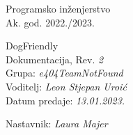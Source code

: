 \documentclass[12pt]{report}
\begin{document}
 
		
		\begin{titlepage}
			\begin{center}
				\LARGE Programsko inženjerstvo\\
				\large Ak. god. 2022./2023.\\
				
				
				\huge DogFriendly\\
				\Large Dokumentacija, Rev. \textit{2}\\
				
				\normalsize
				Grupa: \textit{e404TeamNotFound}\\
				Voditelj: \textit{Leon  Stjepan Uroić}\\
				
				
				Datum predaje: \textit{13.01.2023.}\\
				
				
				Nastavnik: \textit{Laura Majer}\\
				
			\end{center}
			
		\end{titlepage}
		
		\tableofcontents
		
		
		
		
		
		
		
		
		\begingroup
		\renewcommand*\listfigurename{Indeks slika i dijagrama}
		\renewcommand*\listtablename{Indeks tablica}
		\let\clearpage\relax
		\listoffigures
		\vspace{10mm}
		\listoftables
		\endgroup
		
		\eject 
		
		
		
	
\end{document}
